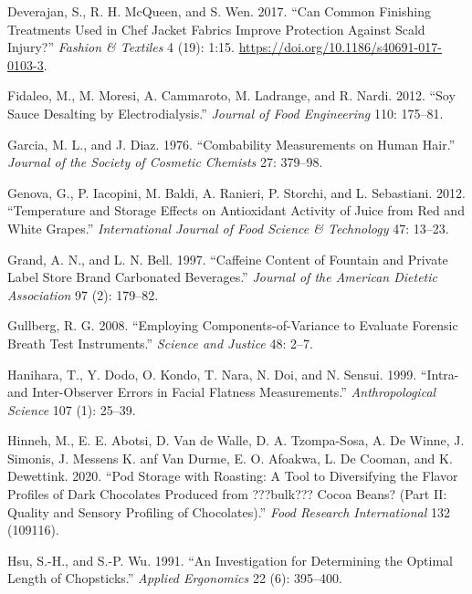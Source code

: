 \documentclass[
]{book}
\newlength{\cslhangindent}
\newenvironment{CSLReferences}[2] %
 {\begin{list}{}{%
  \setlength{\itemindent}{0pt}
  \setlength{\leftmargin}{0pt}
  \setlength{\parsep}{0pt}
  \ifodd #1
   \setlength{\leftmargin}{\cslhangindent}
   \setlength{\itemindent}{-1\cslhangindent}
  \fi
  \setlength{\itemsep}{#2\baselineskip}}}
 {\end{list}}
\begin{document}
\begin{CSLReferences}{1}{0}
Deverajan, S., R. H. McQueen, and S. Wen. 2017. {``Can Common Finishing
Treatments Used in Chef Jacket Fabrics Improve Protection Against Scald
Injury?''} \emph{Fashion \& Textiles} 4 (19): 1:15.
\url{https://doi.org/10.1186/s40691-017-0103-3}.

Fidaleo, M., M. Moresi, A. Cammaroto, M. Ladrange, and R. Nardi. 2012.
{``Soy Sauce Desalting by Electrodialysis.''} \emph{Journal of Food
Engineering} 110: 175--81.

Garcia, M. L., and J. Diaz. 1976. {``Combability Measurements on Human
Hair.''} \emph{Journal of the Society of Cosmetic Chemists} 27: 379--98.

Genova, G., P. Iacopini, M. Baldi, A. Ranieri, P. Storchi, and L.
Sebastiani. 2012. {``Temperature and Storage Effects on Antioxidant
Activity of Juice from Red and White Grapes.''} \emph{International
Journal of Food Science \& Technology} 47: 13--23.

Grand, A. N., and L. N. Bell. 1997. {``Caffeine Content of Fountain and
Private Label Store Brand Carbonated Beverages.''} \emph{Journal of the
American Dietetic Association} 97 (2): 179--82.

Gullberg, R. G. 2008. {``Employing Components-of-Variance to Evaluate
Forensic Breath Test Instruments.''} \emph{Science and Justice} 48:
2--7.

Hanihara, T., Y. Dodo, O. Kondo, T. Nara, N. Doi, and N. Sensui. 1999.
{``Intra- and Inter-Observer Errors in Facial Flatness Measurements.''}
\emph{Anthropological Science} 107 (1): 25--39.

Hinneh, M., E. E. Abotsi, D. Van de Walle, D. A. Tzompa-Sosa, A. De
Winne, J. Simonis, J. Messens K. anf Van Durme, E. O. Afoakwa, L. De
Cooman, and K. Dewettink. 2020. {``Pod Storage with Roasting: A Tool to
Diversifying the Flavor Profiles of Dark Chocolates Produced from
???bulk??? Cocoa Beans? (Part II: Quality and Sensory Profiling of
Chocolates).''} \emph{Food Research International} 132 (109116).

Hsu, S.-H., and S.-P. Wu. 1991. {``An Investigation for Determining the
Optimal Length of Chopsticks.''} \emph{Applied Ergonomics} 22 (6):
395--400.


\end{CSLReferences}
\end{document}
